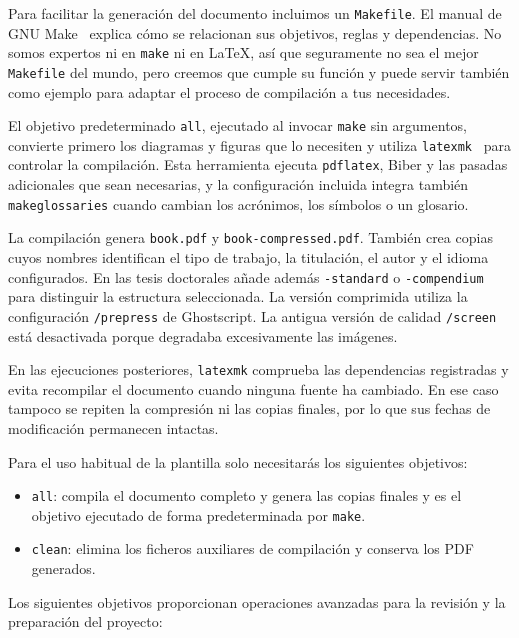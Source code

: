 Para facilitar la generación del documento incluimos un \texttt{Makefile}. El manual de GNU Make~\cite{make} explica cómo se relacionan sus objetivos, reglas y dependencias. No somos expertos ni en \texttt{make} ni en \LaTeX{}, así que seguramente no sea el mejor \texttt{Makefile} del mundo, pero creemos que cumple su función y puede servir también como ejemplo para adaptar el proceso de compilación a tus necesidades.

El objetivo predeterminado \texttt{all}, ejecutado al invocar \texttt{make} sin argumentos, convierte primero los diagramas y figuras que lo necesiten y utiliza \texttt{latexmk}~\cite{latexmk-manual} para controlar la compilación. Esta herramienta ejecuta \texttt{pdflatex}, Biber y las pasadas adicionales que sean necesarias, y la configuración incluida integra también \texttt{makeglossaries} cuando cambian los acrónimos, los símbolos o un glosario.

La compilación genera \texttt{book.pdf} y \texttt{book-compressed.pdf}. También crea copias cuyos nombres identifican el tipo de trabajo, la titulación, el autor y el idioma configurados. En las tesis doctorales añade además \texttt{-standard} o \texttt{-compendium} para distinguir la estructura seleccionada. La versión comprimida utiliza la configuración \texttt{/prepress} de Ghostscript. La antigua versión de calidad \texttt{/screen} está desactivada porque degradaba excesivamente las imágenes.

En las ejecuciones posteriores, \texttt{latexmk} comprueba las dependencias registradas y evita recompilar el documento cuando ninguna fuente ha cambiado. En ese caso tampoco se repiten la compresión ni las copias finales, por lo que sus fechas de modificación permanecen intactas.

Para el uso habitual de la plantilla solo necesitarás los siguientes objetivos:

\begin{itemize}
  \item \texttt{all}: compila el documento completo y genera las copias finales y es el objetivo ejecutado de forma predeterminada por \texttt{make}.
  \item \texttt{clean}: elimina los ficheros auxiliares de compilación y conserva los PDF generados.
\end{itemize}

Los siguientes objetivos proporcionan operaciones avanzadas para la revisión y la preparación del proyecto:

